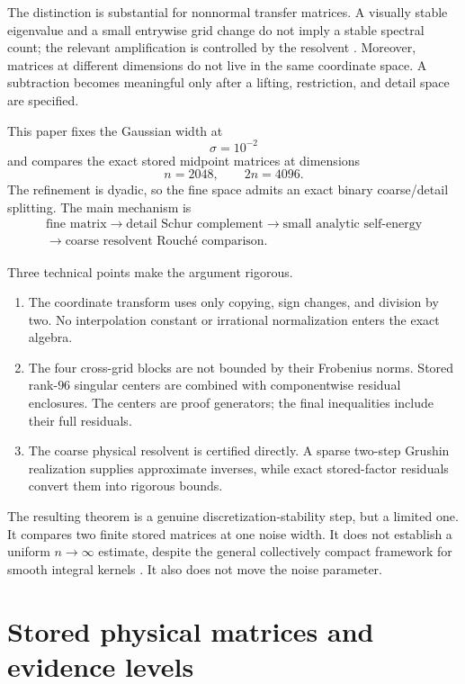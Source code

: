 \documentclass[11pt]{article}
\theoremstyle{definition}
\theoremstyle{remark}
\begin{document}
The distinction is substantial for nonnormal transfer matrices.  A visually
stable eigenvalue and a small entrywise grid change do not imply a stable
spectral count; the relevant amplification is controlled by the resolvent
\citep{Kato1995,TrefethenEmbree2005}.  Moreover, matrices at different
dimensions do not live in the same coordinate space.  A subtraction becomes
meaningful only after a lifting, restriction, and detail space are specified.

This paper fixes the Gaussian width at
\[
 \sigma=10^{-2}
\]
and compares the exact stored midpoint matrices at dimensions
\[
 n=2048,\qquad 2n=4096.
\]
The refinement is dyadic, so the fine space admits an exact binary
coarse/detail splitting.  The main mechanism is
\[
 \begin{gathered}
 \text{fine matrix}\longrightarrow\text{detail Schur complement}
 \longrightarrow\text{small analytic self-energy}\\
 \longrightarrow\text{coarse resolvent Rouch\'e comparison}.
 \end{gathered}
\]

Three technical points make the argument rigorous.
\begin{enumerate}[leftmargin=2em]
 \item The coordinate transform uses only copying, sign changes, and division
       by two.  No interpolation constant or irrational normalization enters
       the exact algebra.
 \item The four cross-grid blocks are not bounded by their Frobenius norms.
       Stored rank-\(96\) singular centers are combined with componentwise
       residual enclosures.  The centers are proof generators; the final
       inequalities include their full residuals.
 \item The coarse physical resolvent is certified directly.  A sparse
       two-step Grushin realization supplies approximate inverses, while exact
       stored-factor residuals convert them into rigorous bounds.
\end{enumerate}

The resulting theorem is a genuine discretization-stability step, but a
limited one.  It compares two finite stored matrices at one noise width.  It
does not establish a uniform \(n\to\infty\) estimate, despite the general
collectively compact framework for smooth integral kernels
\citep{Atkinson1997}.  It also does not move the noise parameter.

\section{Stored physical matrices and evidence levels}
\label{sec:model}
\end{document}
